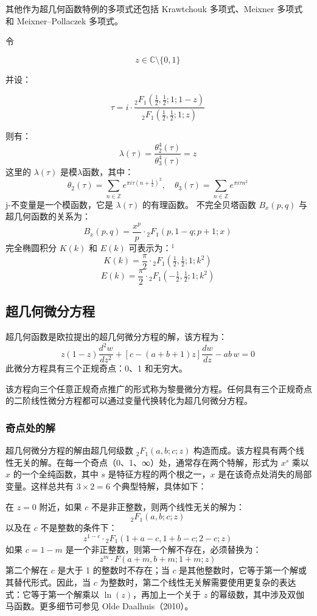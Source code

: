 其他作为超几何函数特例的多项式还包括 Krawtchouk 多项式、Meixner 多项式 和 Meixner–Pollaczek 多项式。

令

$$
z \in \mathbb{C} \setminus \{0, 1\}~
$$

并设：

$$
\tau = i \cdot \frac{{}_2F_1\left(\tfrac{1}{2}, \tfrac{1}{2}; 1; 1 - z\right)}{{}_2F_1\left(\tfrac{1}{2}, \tfrac{1}{2}; 1; z\right)}~
$$

则有：
$$
\lambda(\tau) = \frac{\theta_2^4(\tau)}{\theta_3^4(\tau)} = z~
$$
这里的 $\lambda(\tau)$ 是模$\lambda$函数，其中：
$$
\theta_2(\tau) = \sum_{n \in \mathbb{Z}} e^{\pi i \tau (n + \tfrac{1}{2})^2}, \quad
\theta_3(\tau) = \sum_{n \in \mathbb{Z}} e^{\pi i \tau n^2}~
$$
j-不变量是一个模函数，它是 $\lambda(\tau)$ 的有理函数。
不完全贝塔函数 $B_x(p, q)$ 与超几何函数的关系为：
$$
B_x(p, q) = \frac{x^p}{p} \cdot {}_2F_1(p, 1 - q; p + 1; x)~
$$
完全椭圆积分 $K(k)$ 和 $E(k)$ 可表示为：\(^\text{1}\)
$$
K(k) = \frac{\pi}{2} \cdot {}_2F_1\left(\tfrac{1}{2}, \tfrac{1}{2}; 1; k^2\right)~
$$
$$
E(k) = \frac{\pi}{2} \cdot {}_2F_1\left(-\tfrac{1}{2}, \tfrac{1}{2}; 1; k^2\right)~
$$
\subsection{超几何微分方程}
超几何函数是欧拉提出的超几何微分方程的解，该方程为：
$$
z(1 - z) \frac{d^2 w}{dz^2} + \left[ c - (a + b + 1)z \right] \frac{d w}{dz} - ab\,w = 0~
$$
此微分方程具有三个正规奇点：0、1 和无穷大。

该方程向三个任意正规奇点推广的形式称为黎曼微分方程。任何具有三个正规奇点的二阶线性微分方程都可以通过变量代换转化为超几何微分方程。
\subsubsection{奇点处的解}
超几何微分方程的解由超几何级数 ${}_2F_1(a, b; c; z)$ 构造而成。该方程具有两个线性无关的解。在每一个奇点（0、1、∞）处，通常存在两个特解，形式为 $x^s$ 乘以 $x$ 的一个全纯函数，其中 $s$ 是特征方程的两个根之一，$x$ 是在该奇点处消失的局部变量。这样总共有 $3 \times 2 = 6$ 个典型特解，具体如下：

在 $z = 0$ 附近，如果 $c$ 不是非正整数，则两个线性无关的解为：
$$
{}_2F_1(a, b; c; z)~
$$
以及在 $c$ 不是整数的条件下：
$$
z^{1 - c} \cdot {}_2F_1(1 + a - c, 1 + b - c; 2 - c; z)~
$$
如果 $c = 1 - m$ 是一个非正整数，则第一个解不存在，必须替换为：
$$
z^m \cdot F(a + m, b + m; 1 + m; z)~
$$
第二个解在 $c$ 是大于 1 的整数时不存在；当 $c$ 是其他整数时，它等于第一个解或其替代形式。因此，当 $c$ 为整数时，第二个线性无关解需要使用更复杂的表达式：它等于第一个解乘以 $\ln(z)$，再加上一个关于 $z$ 的幂级数，其中涉及双伽马函数。更多细节可参见 Olde Daalhuis（2010）。

